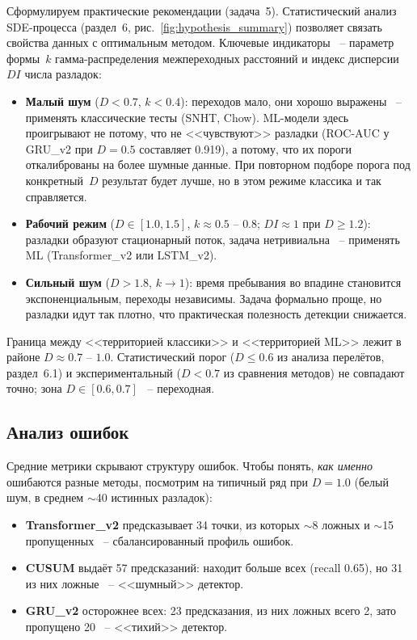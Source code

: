 \documentclass[12pt,a4paper]{article}
\begin{document}
Сформулируем практические рекомендации (задача~5). 
Статистический анализ SDE-процесса (раздел~6, 
рис.~\ref{fig:hypothesis_summary}) позволяет связать 
свойства данных с оптимальным методом. Ключевые индикаторы~ -- 
параметр формы~$k$ гамма-распределения межпереходных 
расстояний и индекс дисперсии~$DI$ числа разладок:
\begin{itemize}
    \item \textbf{Малый шум} ($D < 0.7$, $k < 0.4$): 
    переходов мало, они хорошо выражены~ -- применять 
    классические тесты (SNHT, Chow). ML-модели здесь 
    проигрывают не потому, что не <<чувствуют>> разладки 
    (ROC-AUC у GRU\_v2 при $D = 0.5$ составляет 0.919), 
    а потому, что их пороги откалиброваны на более шумные 
    данные. При повторном подборе порога под конкретный~$D$ результат 
    будет лучше, но в этом режиме классика и так справляется.
    \item \textbf{Рабочий режим} ($D \in [1.0, 1.5]$,
    $k \approx 0.5$ -- $0.8$; $DI \approx 1$ при $D \geq 1.2$): разладки 
    образуют стационарный поток, задача нетривиальна~ -- 
    применять ML (Transformer\_v2 или LSTM\_v2).
    \item \textbf{Сильный шум} ($D > 1.8$, $k \to 1$): 
    время пребывания во впадине становится экспоненциальным, 
    переходы независимы. Задача формально проще, но 
    разладки идут так плотно, что практическая полезность 
    детекции снижается.
\end{itemize}

\noindent Граница между <<территорией классики>> и 
<<территорией ML>> лежит в районе $D \approx 0.7$ -- $1.0$. 
Статистический порог ($D \leq 0.6$ из анализа перелётов, 
раздел~6.1) и экспериментальный ($D < 0.7$ из сравнения 
методов) не совпадают точно; зона $D \in [0.6, 0.7]$~ -- 
переходная.

\subsection{Анализ ошибок}

Средние метрики скрывают структуру ошибок. Чтобы понять, \textit{как именно} ошибаются разные методы, посмотрим на типичный ряд при $D = 1.0$ (белый шум, в среднем $\sim$40 истинных разладок):
\begin{itemize}
    \item \textbf{Transformer\_v2} предсказывает 34 точки, из которых $\sim$8 ложных и $\sim$15 пропущенных~ -- сбалансированный профиль ошибок.
    \item \textbf{CUSUM} выдаёт 57 предсказаний: находит больше всех (recall 0.65), но 31 из них ложные~ -- <<шумный>> детектор.
    \item \textbf{GRU\_v2} осторожнее всех: 23 предсказания, из них ложных всего 2, зато пропущено 20~ -- <<тихий>> детектор.
\end{itemize}
\end{document}
